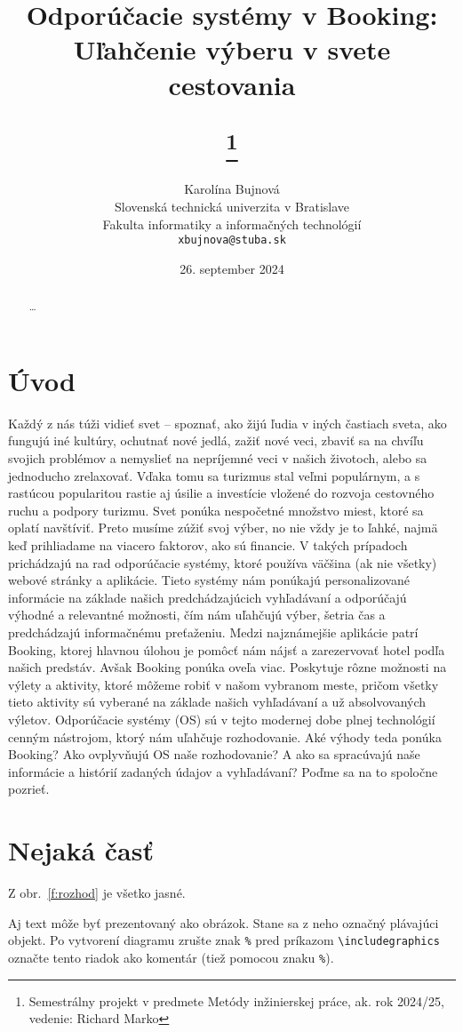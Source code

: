 \documentclass[10pt,twoside,slovak,a4paper]{article}
\title{Odporúčacie systémy v Booking: Uľahčenie výberu v svete cestovania

\thanks{Semestrálny projekt v predmete Metódy inžinierskej práce, ak. rok 2024/25, vedenie: Richard Marko}} %
\author{Karolína Bujnová\\[2pt]
	{\small Slovenská technická univerzita v Bratislave}\\
	{\small Fakulta informatiky a informačných technológií}\\
	{\small \texttt{xbujnova@stuba.sk}}
	}
\date{\small 26. september 2024} %
\begin{document}
\maketitle

\begin{abstract}
\ldots
\end{abstract}



\section{Úvod}
Každý z nás túži vidieť svet – spoznať, ako žijú ľudia v iných častiach sveta, ako fungujú iné kultúry, ochutnať nové jedlá, zažiť nové veci, zbaviť sa na chvíľu svojich problémov a nemyslieť na nepríjemné veci v našich životoch, alebo sa jednoducho zrelaxovať. Vďaka tomu sa turizmus stal veľmi populárnym, a s rastúcou popularitou rastie aj úsilie a investície vložené do rozvoja cestovného ruchu a podpory turizmu.
Svet ponúka nespočetné množstvo miest, ktoré sa oplatí navštíviť. Preto musíme zúžiť svoj výber, no nie vždy je to ľahké, najmä keď prihliadame na viacero faktorov, ako sú financie.
V takých prípadoch prichádzajú na rad odporúčacie systémy, ktoré používa väčšina (ak nie všetky) webové stránky a aplikácie. Tieto systémy nám ponúkajú personalizované informácie na základe našich predchádzajúcich vyhľadávaní a odporúčajú výhodné a relevantné možnosti, čím nám uľahčujú výber, šetria čas a predchádzajú informačnému preťaženiu.
Medzi najznámejšie aplikácie patrí Booking, ktorej hlavnou úlohou je pomôcť nám nájsť a zarezervovať hotel podľa našich predstáv. Avšak Booking ponúka oveľa viac. Poskytuje rôzne možnosti na výlety a aktivity, ktoré môžeme robiť v našom vybranom meste, pričom všetky tieto aktivity sú vyberané na základe našich vyhľadávaní a už absolvovaných výletov.
Odporúčacie systémy (OS) sú v tejto modernej dobe plnej technológií cenným nástrojom, ktorý nám uľahčuje rozhodovanie. Aké výhody teda ponúka Booking? Ako ovplyvňujú OS naše rozhodovanie? A ako sa spracúvajú naše informácie a histórií zadaných údajov a vyhľadávaní? Poďme sa na to spoločne pozrieť.
\section{Nejaká časť} \label{nejaka}

Z obr.~\ref{f:rozhod} je všetko jasné. 

\begin{figure*}[tbh]
\centering
Aj text môže byť prezentovaný ako obrázok. Stane sa z neho označný plávajúci objekt. Po vytvorení diagramu zrušte znak \texttt{\%} pred príkazom \verb|\includegraphics| označte tento riadok ako komentár (tiež pomocou znaku \texttt{\%}).
\caption{Rozhodujúci argument.}
\label{f:rozhod}
\end{figure*}
\end{document}

